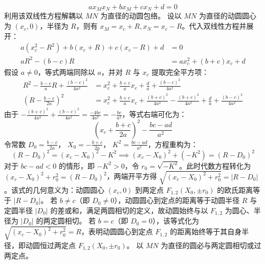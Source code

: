 \begin{solution}
$$ a x_M x_N + b x_M + c x_N + d = 0 $$
利用该双线性方程解耦以 $MN$ 为直径的动圆包络。
设以 $MN$ 为直径的动圆圆心为 $(x_c, 0)$，半径为 $R$，则有 $x_M = x_c + R, x_N = x_c - R$。代入双线性方程并展开：
\begin{align*}
a (x_c^2 - R^2) + b (x_c + R) + c (x_c - R) + d &= 0 \\
a R^2 - (b-c) R &= a x_c^2 + (b+c) x_c + d
\end{align*}
假设 $a \neq 0$，等式两端同除以 $a$，并对 $R$ 与 $x_c$ 提取完全平方项：
\begin{align*}
R^2 - \frac{b-c}{a}R + \frac{(b-c)^2}{4a^2} &= x_c^2 + \frac{b+c}{a}x_c + \frac{d}{a} + \frac{(b-c)^2}{4a^2} \\
\left( R - \frac{b-c}{2a} \right)^2 &= x_c^2 + \frac{b+c}{a}x_c + \frac{(b+c)^2}{4a^2} - \frac{(b+c)^2}{4a^2} + \frac{d}{a} + \frac{(b-c)^2}{4a^2}
\end{align*}
由于 $-\frac{(b+c)^2}{4a^2} + \frac{(b-c)^2}{4a^2} = \frac{-4bc}{4a^2} = -\frac{bc}{a^2}$，等式右端可化为：
$$ \left( x_c + \frac{b+c}{2a} \right)^2 - \frac{bc - ad}{a^2} $$
令常数 $D_0 = \frac{b-c}{2a}$， $X_0 = -\frac{b+c}{2a}$， $K^2 = \frac{bc - ad}{a^2}$，方程重构为：
$$ (R - D_0)^2 = (x_c - X_0)^2 - K^2 \implies (x_c - X_0)^2 + (-K^2) = (R - D_0)^2 $$
对于 $bc - ad < 0$ 的情形，即 $-K^2 > 0$，令 $r_0 = \sqrt{-K^2}$。此时代数方程转化为 $(x_c - X_0)^2 + r_0^2 = (R - D_0)^2$，两端开平方得 $\sqrt{(x_c - X_0)^2 + r_0^2} = |R - D_0|$。该式的几何意义为：动圆圆心 $(x_c, 0)$ 到两定点 $F_{1,2}(X_0, \pm r_0)$ 的欧氏距离等于 $|R - D_0|$。
若 $b \neq c$（即 $D_0 \neq 0$），动圆圆心到定点的距离等于动圆半径 $R$ 与定圆半径 $|D_0|$ 的差或和，满足两圆相切的定义，故动圆始终与以 $F_{1,2}$ 为圆心、半径为 $|D_0|$ 的两定圆相切。
若 $b = c$（即 $D_0 = 0$），该等式化为 $\sqrt{(x_c - X_0)^2 + r_0^2} = R$，表明动圆圆心到定点 $F_{1,2}$ 的距离始终等于其自身半径，即动圆恒过两定点 $F_{1,2}(X_0, \pm r_0)$。
以 $MN$ 为直径的圆必与两定圆相切或过两定点。
\end{solution}

